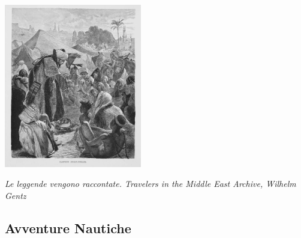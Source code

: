 \documentclass[a4paper,twoside,openany]{book}
\begin{document}
\vfill

\begin{center}
\includegraphics[keepaspectratio,width=0.45\textwidth]{immagini/Eastern_Story_Teller_1878.png}

\emph{Le leggende vengono raccontate. Travelers in the Middle East Archive, Wilhelm Gentz}
\end{center}

\pagebreak

\subsection{Avventure Nautiche}
\end{document}
